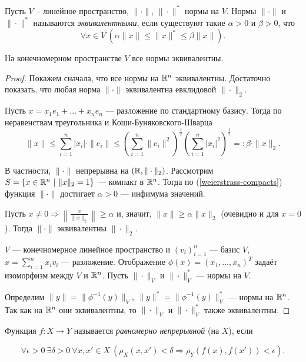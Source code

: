 \begin{definition}
    Пусть $V$ -- линейное пространство, $\|\cdot\|$, $\|\cdot\|^{*}$ нормы на $V$. Нормы $\|\cdot\|$ и $\|\cdot\|^{*}$ называются \textit{эквивалентными}, если существуют такие $\alpha > 0$ и $\beta > 0$, что
    \[\forall x \in V \ \left(\alpha\|x\| \leq \|x\|^{*} \leq \beta \|x\|\right).\]
\end{definition}

\begin{corollary}
    На конечномерном пространстве $V$ все нормы эквивалентны.
\end{corollary}

\begin{proof}
    Покажем сначала, что все нормы на $\mathbb{R}^n$ эквивалентны. Достаточно показать, что любая норма $\|\cdot\|$ эквивалентна евклидовой $\|\cdot\|_2$.

    Пусть $x = x_1 e_1 + \ldots + x_n e_n$ --- разложение по стандартному базису. Тогда по неравенствам треугольника и Коши-Буняковского-Шварца
    \[
        \|x\| \le \sum_{i = 1}^n |x_i| \cdot \|e_i\| \le \left(\sum_{i = 1}^n \|e_i\|^2\right)^{\frac{1}{2}}\left(\sum_{i = 1}^n |x_i|^2\right)^{\frac{1}{2}} =: \beta \cdot \|x\|_2.
    \]

    В частности, $\|\cdot\|$ непрерывна на $(\mathbb{R}, \|\cdot\|_2)$. Рассмотрим $S = \{x \in \mathbb{R}^n \ | \ \|x\|_2 = 1\}$ --- компакт в $\mathbb{R}^n$. Тогда по (\ref{weierstrass-compacts}) функция $\|\cdot\|$ достигает $\alpha > 0$ --- инфимума значений.

    Пусть $x \neq 0 \Rightarrow \left\|\frac{x}{\|x\|_2}\right\| \ge \alpha$ и, значит, $\|x\| \ge \alpha \|x\|_2$ (очевидно и для $x = 0$). Тогда $\|\cdot\|$ эквивалентны $\|\cdot\|_{2}$.

    $V$ --- конечномерное линейное пространство и $(v_i)_{i = 1}^n$ --- базис $V$, $x = \sum_{i = 1}^n x_i v_i$ --- разложение. Отображение $\phi(x) = (x_1, \ldots, x_n)^T$ задаёт изоморфизм между $V$ и $\mathbb{R}^n$. Пусть $\|\cdot\|_V$ и $\|\cdot\|^*_V$ --- нормы на $V$.

    Определим $\|y\| = \|\phi^{-1}(y)\|_V, \ \|y\|^* = \|\phi^{-1}(y)\|_V^*$ --- нормы на $\mathbb{R}^n$. Так как на $\mathbb{R}^{n}$ они эквивалентны, то $\|\cdot\|_V$ и $\|\cdot\|_V^*$ также эквивалентны.
\end{proof}

\begin{definition}
    Функция $f: X \to Y$ называется \textit{равномерно непрерывной} (на $X$), если

    \[\forall \epsilon > 0 \ \exists \delta > 0 \ \forall x, x' \in X \ (\rho_{X}(x, x') < \delta \Rightarrow \rho_{Y}(f(x), f(x')) < \epsilon).\]
\end{definition}


